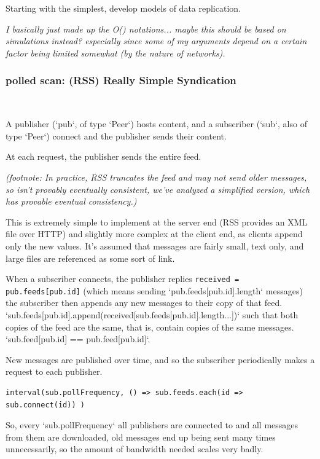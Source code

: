 \documentclass[sigconf]{acmart}
\begin{document}
Starting with the simplest, develop models of data replication.

{\em I basically just made up the O() notations... maybe this should
  be based on simulations instead?  especially since some of my
  arguments depend on a certain factor being limited somewhat (by the
  nature of networks).}

\subsubsection{polled scan: (RSS) Really Simple Syndication}\ \\ \vspace{-1em}

A publisher (`pub`, of type `Peer`) hosts content, and a subscriber
(`sub`, also of type `Peer`) connect and the publisher sends their
content.

At each request, the publisher sends the entire feed.

{\em (footnote: In practice, RSS truncates the feed and may not send
  older messages, so isn't provably eventually consistent, we've
  analyzed a simplified version, which has provable eventual
  consistency.)}

This is extremely simple to implement at the server end (RSS provides
an XML file over HTTP) and slightly more complex at the client end, as
clients append only the new values.  It's assumed that messages are
fairly small, text only, and large files are referenced as some sort
of link.

When a subscriber connects, the publisher replies {\tt received =
pub.feeds[pub.id]} (which means sending `pub.feeds[pub.id].length`
messages) the subscriber then appends any new messages to their copy
of that feed.
`sub.feeds[pub.id].append(received[sub.feeds[pub.id].length...])` such
that both copies of the feed are the same, that is, contain copies of
the same messages. `sub.feed[pub.id] == pub.feed[pub.id]`.

New messages are published over time, and so the subscriber
periodically makes a request to each publisher.

\begin{verbatim}
interval(sub.pollFrequency, () => sub.feeds.each(id => sub.connect(id)) )
\end{verbatim}

So, every `sub.pollFrequency` all publishers are connected to and all
messages from them are downloaded, old messages end up being sent many
times unnecessarily, so the amount of bandwidth needed scales very
badly.
\end{document}
